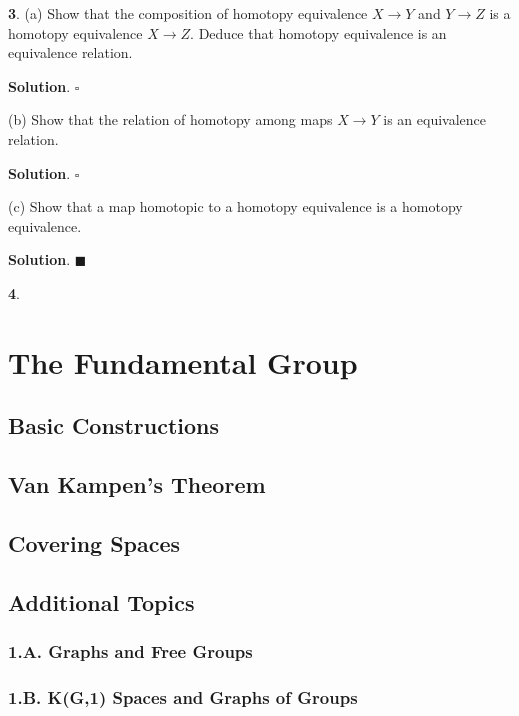 \documentclass{article}
\begin{document}
\textbf{3}. (a) Show that the composition of homotopy equivalence $X\to Y$ and $Y\to Z$ is a homotopy equivalence $X\to Z$. Deduce that homotopy equivalence is an equivalence relation.
\medskip

\textbf{Solution}. $\square$
\medskip

(b) Show that the relation of homotopy among maps $X\to Y$ is an equivalence relation.
\medskip

\textbf{Solution}. $\square$
\medskip

(c) Show that a map homotopic to a homotopy equivalence is a homotopy equivalence.
\medskip

\textbf{Solution}. $\blacksquare$
\bigskip
\bigskip

\textbf{4}.
\newpage

\section{The Fundamental Group}

\subsection{Basic Constructions}

\subsection{Van Kampen's Theorem}

\subsection{Covering Spaces}

\subsection*{Additional Topics}

\subsubsection*{1.A. Graphs and Free Groups}

\subsubsection*{1.B. K(G,1) Spaces and Graphs of Groups}
\end{document}

